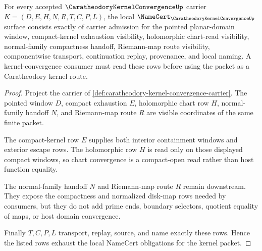 \begin{theorem}
\label{thm:caratheodory-kernel-convergence-namecert-obligations}
For every accepted $\CaratheodoryKernelConvergenceUp$ carrier $K=(D,E,H,N,R,T,C,P,L)$, the local $\NameCert_{\CaratheodoryKernelConvergenceUp}$ surface consists exactly of carrier admission for the pointed planar-domain window, compact-kernel exhaustion visibility, holomorphic chart-read visibility, normal-family compactness handoff, Riemann-map route visibility, componentwise transport, continuation replay, provenance, and local naming. A kernel-convergence consumer must read these rows before using the packet as a Caratheodory kernel route.
\end{theorem}
\begin{proof}
Project the carrier of \autoref{def:caratheodory-kernel-convergence-carrier}. The pointed window $D$, compact exhaustion $E$, holomorphic chart row $H$, normal-family handoff $N$, and Riemann-map route $R$ are visible coordinates of the same finite packet.

The compact-kernel row $E$ supplies both interior containment windows and exterior escape rows. The holomorphic row $H$ is read only on those displayed compact windows, so chart convergence is a compact-open read rather than host function equality.

The normal-family handoff $N$ and Riemann-map route $R$ remain downstream. They expose the compactness and normalized disk-map rows needed by consumers, but they do not add prime ends, boundary selectors, quotient equality of maps, or host domain convergence.

Finally $T,C,P,L$ transport, replay, source, and name exactly these rows. Hence the listed rows exhaust the local NameCert obligations for the kernel packet.
\end{proof}

